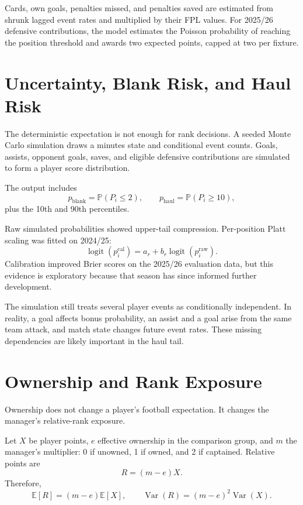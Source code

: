 \documentclass[11pt,a4paper]{article}
\newcommand{\E}{\mathbb{E}}
\newcommand{\Var}{\operatorname{Var}}
\newcommand{\Prob}{\mathbb{P}}
\begin{document}
Cards, own goals, penalties missed, and penalties saved are estimated from shrunk lagged event rates and multiplied by their FPL values. For 2025/26 defensive contributions, the model estimates the Poisson probability of reaching the position threshold and awards two expected points, capped at two per fixture.

\section{Uncertainty, Blank Risk, and Haul Risk}

The deterministic expectation is not enough for rank decisions. A seeded Monte Carlo simulation draws a minutes state and conditional event counts. Goals, assists, opponent goals, saves, and eligible defensive contributions are simulated to form a player score distribution.

The output includes
\begin{equation}
  p_{\text{blank}}=\Prob(P_i\leq 2),\qquad
  p_{\text{haul}}=\Prob(P_i\geq 10),
\end{equation}
plus the 10th and 90th percentiles.

Raw simulated probabilities showed upper-tail compression. Per-position Platt scaling was fitted on 2024/25:
\begin{equation}
  \operatorname{logit}(p_i^{\text{cal}})=a_r+b_r\operatorname{logit}(p_i^{\text{raw}}).
\end{equation}
Calibration improved Brier scores on the 2025/26 evaluation data, but this evidence is exploratory because that season has since informed further development.

The simulation still treats several player events as conditionally independent. In reality, a goal affects bonus probability, an assist and a goal arise from the same team attack, and match state changes future event rates. These missing dependencies are likely important in the haul tail.

\section{Ownership and Rank Exposure}

Ownership does not change a player's football expectation. It changes the manager's relative-rank exposure.

Let $X$ be player points, $e$ effective ownership in the comparison group, and $m$ the manager's multiplier: 0 if unowned, 1 if owned, and 2 if captained. Relative points are
\begin{equation}
  R=(m-e)X.
\end{equation}
Therefore,
\begin{equation}
  \E[R]=(m-e)\E[X],\qquad
  \Var(R)=(m-e)^2\Var(X).
\end{equation}
\end{document}
